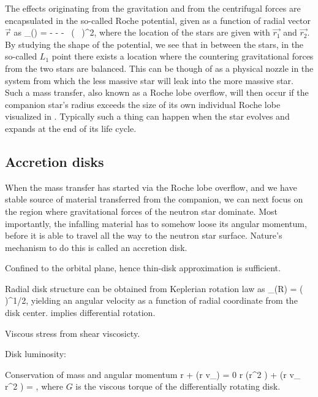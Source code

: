 The effects originating from the gravitation and from the centrifugal forces are encapsulated in the so-called Roche potential, given as a function of radial vector $\vec{r}$ as\cite[see, e.g.,][]{PRP02, LL15}
\be
\Phi_{}() = - - -  ( \vec{ \omega } \times {} )^2,
\ee
where the location of the stars are given with $\vec{r_1}$ and $\vec{r_2}$.
By studying the shape of the potential, we see that in between the stars, in the so-called $L_1$ point there exists a location where the countering gravitational forces from the two stars are balanced.
This can be though of as a physical nozzle in the system from which the less massive star will leak into the more massive star.
Such a mass transfer, also known as a Roche lobe overflow, will then occur if the companion star's radius exceeds the size of its own individual Roche lobe visualized in .
Typically such a thing can happen when the star evolves and expands at the end of its life cycle. 


\subsection{Accretion disks}

When the mass transfer has started via the Roche lobe overflow, and we have stable source of material transferred from the companion, we can next focus on the region where gravitational forces of the neutron star dominate.
Most importantly, the infalling material has to somehow loose its angular momentum, before it is able to travel all the way to the neutron star surface.
Nature's mechanism to do this is called an accretion disk.



Confined to the orbital plane, hence thin-disk approximation is sufficient.

Radial disk structure can be obtained from Keplerian rotation law as
\be
\Omega_{}(R) = \left(  \right)^{1/2},
\ee
yielding an angular velocity as a function of radial coordinate from the disk center.
implies differential rotation.

Viscous stress from shear viscosicty.

Disk luminosity:

Conservation of mass and angular momentum
\be
r  + (r \Sigma v_{}) = 0
\ee
\be
r (\Sigma r^2 \Omega) +  (r \Sigma v_{} r^2 \Omega) =  ,
\ee
where $G$ is the viscous torque of the differentially rotating disk.

